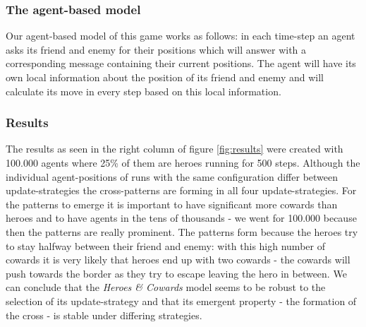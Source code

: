 \subsubsection{The agent-based model}
Our agent-based model of this game works as follows: in each time-step an agent asks its friend and enemy for their positions which will answer with a corresponding message containing their current positions. The agent will have its own local information about the position of its friend and enemy and will calculate its move in every step based on this local information.

\subsubsection{Results}
The results as seen in the right column of figure \ref{fig:results} were created with 100.000 agents where 25\% of them are heroes running for 500 steps. Although the individual agent-positions of runs with the same configuration differ between update-strategies the cross-patterns are forming in all four update-strategies. For the patterns to emerge it is important to have significant more cowards than heroes and to have agents in the tens of thousands - we went for 100.000 because then the patterns are really prominent. The patterns form because the heroes try to stay halfway between their friend and enemy: with this high number of cowards it is very likely that heroes end up with two cowards - the cowards will push towards the border as they try to escape leaving the hero in between. We can conclude that the \textit{Heroes \& Cowards} model seems to be robust to the selection of its update-strategy and that its emergent property - the formation of the cross - is stable under differing strategies.